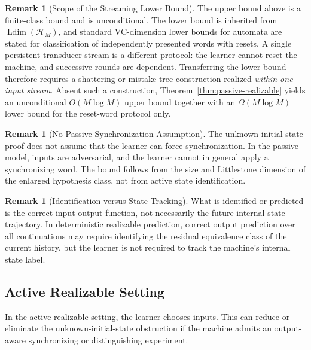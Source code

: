 \documentclass[12pt]{article}
\theoremstyle{definition}
\newtheorem{remark}[theorem]{Remark}
\DeclareMathOperator{\Ldim}{Ldim}
\begin{document}
\begin{remark}[Scope of the Streaming Lower Bound]
\label{rem:streaming-lower-scope}
The upper bound above is a finite-class bound and is unconditional.  The
lower bound is inherited from $\Ldim(\mathcal H_M)$, and standard
VC-dimension lower bounds for automata are stated for classification of
independently presented words with resets.  A single persistent transducer
stream is a different protocol: the learner cannot reset the machine, and
successive rounds are dependent.  Transferring the lower bound therefore
requires a shattering or mistake-tree construction realized \emph{within one
input stream}.  Absent such a construction,
Theorem~\ref{thm:passive-realizable} yields an unconditional $O(M\log M)$
upper bound together with an $\Omega(M\log M)$ lower bound for the reset-word
protocol only.
\end{remark}

\begin{remark}[No Passive Synchronization Assumption]
\label{rem:passive-no-sync}
The unknown-initial-state proof does not assume that the learner can force
synchronization.  In the passive model, inputs are adversarial, and the learner
cannot in general apply a synchronizing word.  The bound follows from the size
and Littlestone dimension of the enlarged hypothesis class, not from active
state identification.
\end{remark}

\begin{remark}[Identification versus State Tracking]
\label{rem:identification-vs-tracking}
What is identified or predicted is the correct input-output function, not
necessarily the future internal state trajectory.  In deterministic realizable
prediction, correct output prediction over all continuations may require
identifying the residual equivalence class of the current history, but the
learner is not required to track the machine's internal state label.
\end{remark}

\subsection{Active Realizable Setting}
\label{subsec:active-realizable}

In the active realizable setting, the learner chooses inputs.  This can reduce
or eliminate the unknown-initial-state obstruction if the machine admits an
output-aware synchronizing or distinguishing experiment.
\end{document}

